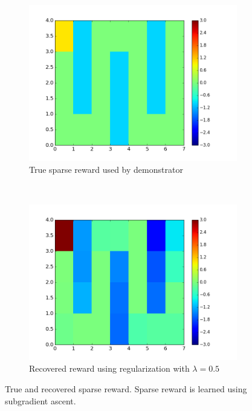 \documentclass[10pt,a4paper]{article}
\begin{document}
\begin{figure}
    \centering
    \begin{subfigure}[b]{0.55\textwidth}
        \includegraphics[width=\textwidth]{figs/true_reward.png}
        \caption{True sparse reward used by demonstrator}
        \label{subfig:true_sparse_reward}
    \end{subfigure}
    ~ %
    \begin{subfigure}[b]{0.55\textwidth}
        \includegraphics[width=\textwidth]{figs/recovered_reward_lam0_5.png}
        \caption{Recovered reward using regularization with $\lambda = 0.5$}
        \label{subfig:recovered_sparse_reward}
    \end{subfigure}
    \caption{True and recovered sparse reward. Sparse reward is learned using subgradient ascent.}\label{fig:sparse_reward}
\end{figure}
\end{document}
